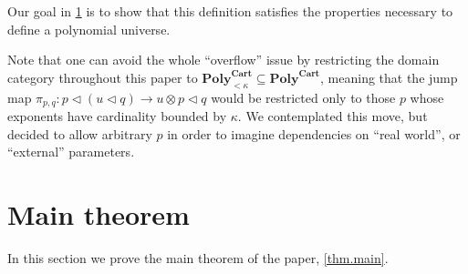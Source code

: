 \documentclass[11pt, one side, article]{memoir}
\theoremstyle{definition}
\theoremstyle{plain}
\renewcommand{\ss}{\subseteq}
\newcommand{\Cat}[1]{\mathbf{#1}}%
\newcommand{\poly}{\Cat{Poly}}
\newcommand{\polycart}{\poly^{\Cat{Cart}}}
\newcommand{\0}{\textsf{0}}
\newcommand{\1}{\tn{\textsf{1}}}
\newcommand{\tri}{\mathbin{\triangleleft}}
\newcommand{\jump}{\pi}
\begin{document}
Our goal in \cref{sec.main_thm} is to show that this definition satisfies the properties necessary to define a polynomial universe. 

Note that one can avoid the whole ``overflow'' issue by restricting the domain category throughout this paper to $\polycart_{<\kappa}\ss\polycart$, meaning that the jump map $\jump_{p,q}\colon p\tri (u\tri q)\to u\otimes p\tri q$ would be restricted only to those $p$ whose exponents have cardinality bounded by $\kappa$. We contemplated this move, but decided to allow arbitrary $p$ in order to imagine dependencies on ``real world'', or ``external'' parameters.

\section{Main theorem}\label{sec.main_thm}

In this section we prove the main theorem of the paper, \cref{thm.main}.
\end{document}
